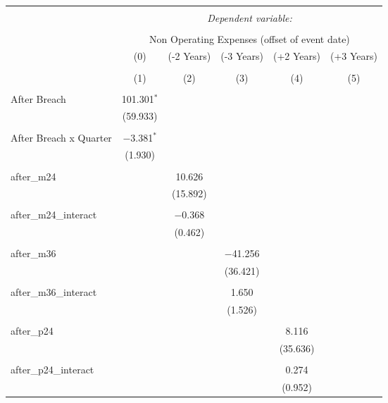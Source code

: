 
\begin{table}[!htbp] \centering 
  \caption{} 
  \label{} 
\begin{tabular}{@{\extracolsep{5pt}}lccccc} 
\\[-1.8ex]\hline 
\hline \\[-1.8ex] 
 & \multicolumn{5}{c}{\textit{Dependent variable:}} \\ 
\cline{2-6} 
\\[-1.8ex] & \multicolumn{5}{c}{Non Operating Expenses (offset of event date)} \\ 
 & (0) & (-2 Years) & (-3 Years) & (+2 Years) & (+3 Years) \\ 
\\[-1.8ex] & (1) & (2) & (3) & (4) & (5)\\ 
\hline \\[-1.8ex] 
 After Breach & 101.301$^{*}$ &  &  &  &  \\ 
  & (59.933) &  &  &  &  \\ 
  & & & & & \\ 
 After Breach x Quarter & $-$3.381$^{*}$ &  &  &  &  \\ 
  & (1.930) &  &  &  &  \\ 
  & & & & & \\ 
 after\_m24 &  & 10.626 &  &  &  \\ 
  &  & (15.892) &  &  &  \\ 
  & & & & & \\ 
 after\_m24\_interact &  & $-$0.368 &  &  &  \\ 
  &  & (0.462) &  &  &  \\ 
  & & & & & \\ 
 after\_m36 &  &  & $-$41.256 &  &  \\ 
  &  &  & (36.421) &  &  \\ 
  & & & & & \\ 
 after\_m36\_interact &  &  & 1.650 &  &  \\ 
  &  &  & (1.526) &  &  \\ 
  & & & & & \\ 
 after\_p24 &  &  &  & 8.116 &  \\ 
  &  &  &  & (35.636) &  \\ 
  & & & & & \\ 
 after\_p24\_interact &  &  &  & 0.274 &  \\ 
  &  &  &  & (0.952) &  \\ 

\end{tabular}
\end{table}
